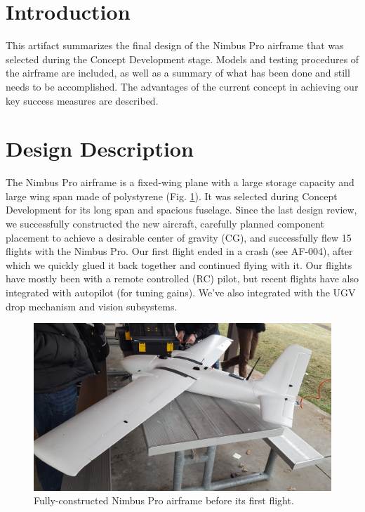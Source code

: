 \documentclass[]{auvsi_doc}
\begin{document}
\begin{AUVSITitlePage}
\begin{artifacttable}
\end{artifacttable}
\end{AUVSITitlePage}

\section{Introduction}
This artifact summarizes the final design of the Nimbus Pro airframe that was selected during the Concept Development stage. Models and testing procedures of the airframe are included, as well as a summary of what has been done and still needs to be accomplished. The advantages of the current concept in achieving our key success measures are described.

\section{Design Description}
The Nimbus Pro airframe is a fixed-wing plane with a large storage capacity and large wing span made of polystyrene (Fig. \ref{fig:plane1}). It was selected during Concept Development for its long span and spacious fuselage. Since the last design review, we successfully constructed the new aircraft, carefully planned component placement to achieve a desirable center of gravity (CG), and successfully flew 15 flights with the Nimbus Pro. Our first flight ended in a crash (see AF-004), after which we quickly glued it back together and continued flying with it. Our flights have mostly been with a remote controlled (RC) pilot, but recent flights have also integrated with autopilot (for tuning gains). We've also integrated with the UGV drop mechanism and vision subsystems.

\begin{figure}[h!]
	\centering
	\includegraphics[width=.9\columnwidth]{figs/plane1}
	\caption{Fully-constructed Nimbus Pro airframe before its first flight.}
	\label{fig:plane1}
\end{figure}
\end{document}

